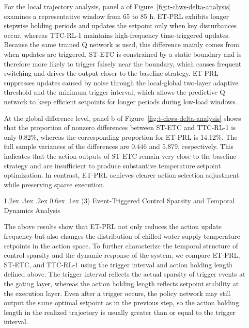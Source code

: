 \documentclass[preprint,12pt,number]{elsarticle}
\makeatletter
\renewcommand\paragraph{\@startsection{paragraph}{4}{\z@}%
  {1.2ex \@plus .3ex \@minus .2ex}%
  {0.6ex \@plus .1ex}%
  {\normalfont\normalsize}}
\makeatother
\begin{document}
For the local trajectory analysis, panel a of Figure~\ref{fig:t-chws-delta-analysis} examines a representative window from 65 to 85 h. ET-PRL exhibits longer stepwise holding periods and updates the setpoint only when key disturbances occur, whereas TTC-RL-1 maintains high-frequency time-triggered updates. Because the same trained Q network is used, this difference mainly comes from when updates are triggered. ST-ETC is constrained by a static boundary and is therefore more likely to trigger falsely near the boundary, which causes frequent switching and drives the output closer to the baseline strategy. ET-PRL suppresses updates caused by noise through the local-global two-layer adaptive threshold and the minimum trigger interval, which allows the predictive Q network to keep efficient setpoints for longer periods during low-load windows.

At the global difference level, panel b of Figure~\ref{fig:t-chws-delta-analysis} shows that the proportion of nonzero differences between ST-ETC and TTC-RL-1 is only 0.82\%, whereas the corresponding proportion for ET-PRL is 14.12\%. The full sample variances of the differences are \(0.446\) and \(5.879\), respectively. This indicates that the action outputs of ST-ETC remain very close to the baseline strategy and are insufficient to produce substantive temperature setpoint optimization. In contrast, ET-PRL achieves clearer action selection adjustment while preserving sparse execution.

\paragraph{(3) Event-Triggered Control Sparsity and Temporal Dynamics Analysis}\label{event-triggered-control-sparsity-and-temporal-dynamics-analysis}

The above results show that ET-PRL not only reduces the action update frequency but also changes the distribution of chilled water supply temperature setpoints in the action space. To further characterize the temporal structure of control sparsity and the dynamic response of the system, we compare ET-PRL, ST-ETC, and TTC-RL-1 using the trigger interval and action holding length defined above. The trigger interval reflects the actual sparsity of trigger events at the gating layer, whereas the action holding length reflects setpoint stability at the execution layer. Even after a trigger occurs, the policy network may still output the same optimal setpoint as in the previous step, so the action holding length in the realized trajectory is usually greater than or equal to the trigger interval.
\end{document}
